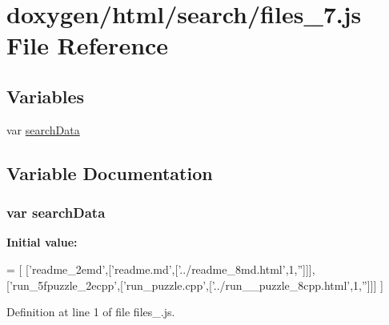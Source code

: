 \hypertarget{a00080}{}\section{doxygen/html/search/files\+\_\+7.js File Reference}
\label{a00080}
\subsection*{Variables}
\begin{DoxyCompactItemize}
\item 
var \hyperlink{a00080_ad01a7523f103d6242ef9b0451861231e}{search\+Data}
\end{DoxyCompactItemize}


\subsection{Variable Documentation}
\hypertarget{a00080_ad01a7523f103d6242ef9b0451861231e}{}
\subsubsection[{search\+Data}]{\setlength{\rightskip}{0pt plus 5cm}var search\+Data}\label{a00080_ad01a7523f103d6242ef9b0451861231e}
{\bfseries Initial value\+:}
\begin{DoxyCode}
=
[
  [\textcolor{stringliteral}{'readme\_2emd'},[\textcolor{stringliteral}{'readme.md'},[\textcolor{stringliteral}{'../readme\_8md.html'},1,\textcolor{stringliteral}{''}]]],
  [\textcolor{stringliteral}{'run\_5fpuzzle\_2ecpp'},[\textcolor{stringliteral}{'run\_puzzle.cpp'},[\textcolor{stringliteral}{'../run\_\_puzzle\_8cpp.html'},1,\textcolor{stringliteral}{''}]]]
]
\end{DoxyCode}


Definition at line 1 of file files\+\_.\+js.

